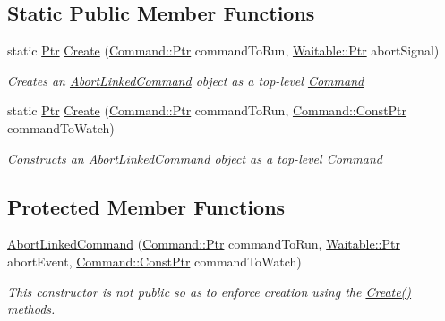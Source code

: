 \subsection*{Static Public Member Functions}
\begin{DoxyCompactItemize}
\item 
static \mbox{\hyperlink{class_command_lib_1_1_abort_linked_command_acb916ab386f796250b4978538d9eabd8}{Ptr}} \mbox{\hyperlink{class_command_lib_1_1_abort_linked_command_ab359541aab47533699365c2d74af1c5c}{Create}} (\mbox{\hyperlink{class_command_lib_1_1_command_a3b3e4f00144373299df5c6bb1acc319d}{Command\+::\+Ptr}} command\+To\+Run, \mbox{\hyperlink{class_command_lib_1_1_waitable_ac74b6b91e48220146eada76a31cf2d9b}{Waitable\+::\+Ptr}} abort\+Signal)
\begin{DoxyCompactList}\small\item\em Creates an \mbox{\hyperlink{class_command_lib_1_1_abort_linked_command}{Abort\+Linked\+Command}} object as a top-\/level \mbox{\hyperlink{class_command_lib_1_1_command}{Command}} \end{DoxyCompactList}\item 
static \mbox{\hyperlink{class_command_lib_1_1_abort_linked_command_acb916ab386f796250b4978538d9eabd8}{Ptr}} \mbox{\hyperlink{class_command_lib_1_1_abort_linked_command_ab3f6ae763ac98e85ce485d1cb7286960}{Create}} (\mbox{\hyperlink{class_command_lib_1_1_command_a3b3e4f00144373299df5c6bb1acc319d}{Command\+::\+Ptr}} command\+To\+Run, \mbox{\hyperlink{class_command_lib_1_1_command_aee8fd78ff853a1f9c8e56959c3e81811}{Command\+::\+Const\+Ptr}} command\+To\+Watch)
\begin{DoxyCompactList}\small\item\em Constructs an \mbox{\hyperlink{class_command_lib_1_1_abort_linked_command}{Abort\+Linked\+Command}} object as a top-\/level \mbox{\hyperlink{class_command_lib_1_1_command}{Command}} \end{DoxyCompactList}\end{DoxyCompactItemize}
\subsection*{Protected Member Functions}
\begin{DoxyCompactItemize}
\item 
\mbox{\hyperlink{class_command_lib_1_1_abort_linked_command_a0141b7dda2d5927ea405c888876224ec}{Abort\+Linked\+Command}} (\mbox{\hyperlink{class_command_lib_1_1_command_a3b3e4f00144373299df5c6bb1acc319d}{Command\+::\+Ptr}} command\+To\+Run, \mbox{\hyperlink{class_command_lib_1_1_waitable_ac74b6b91e48220146eada76a31cf2d9b}{Waitable\+::\+Ptr}} abort\+Event, \mbox{\hyperlink{class_command_lib_1_1_command_aee8fd78ff853a1f9c8e56959c3e81811}{Command\+::\+Const\+Ptr}} command\+To\+Watch)
\begin{DoxyCompactList}\small\item\em This constructor is not public so as to enforce creation using the \mbox{\hyperlink{class_command_lib_1_1_abort_linked_command_ab359541aab47533699365c2d74af1c5c}{Create()}} methods. \end{DoxyCompactList}\end{DoxyCompactItemize}
